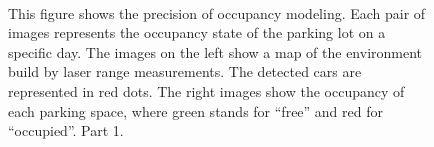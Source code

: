 \begin{figure}[p]
\hspace{2mm}
\\
\caption{This figure shows the precision of occupancy modeling. Each pair of images represents the occupancy state of the parking lot on a specific day. The images on the left show a map of the environment build by laser range measurements. The detected cars are represented in red dots. The right images show the occupancy of each parking space, where green stands for ``free'' and red for ``occupied''. Part 1.}
\label{fig:mapping_examples_1}
\end{figure}

